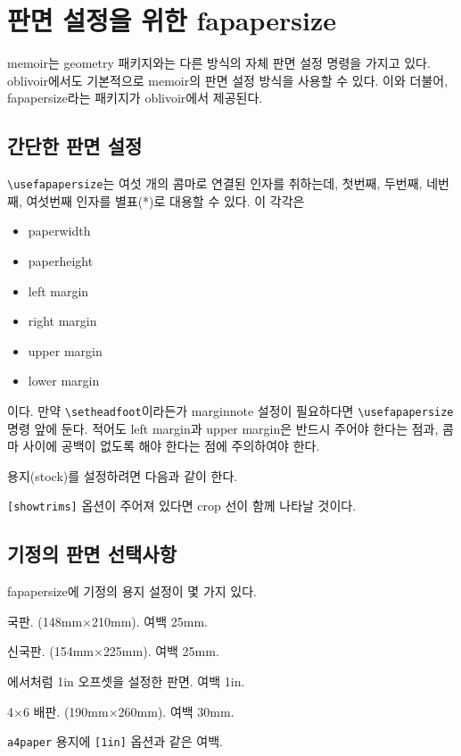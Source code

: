 \documentclass[
	12pt,
	a4paper,
	kosection,
	footnote,
	microtype,
	figtabcapt,
]{oblivoir}
\def\cs#1{\texttt{\textbackslash #1}}
\begin{document}
\clearpage

\section{판면 설정을 위한 fapapersize}

memoir는 geometry 패키지와는 다른 방식의 자체 판면 설정 명령을 가지고 있다.
oblivoir에서도 기본적으로 memoir의 판면 설정 방식을 사용할 수 있다.
이와 더불어, \textsf{fapapersize}라는 패키지가
oblivoir에서 제공된다.

\subsection{간단한 판면 설정}

\begin{boxedverbatim}
\usepackage{fapapersize}
\usefapapersize{*,*,1in,*,1in,*}
\end{boxedverbatim}

\cs{usefapapersize}는 여섯 개의 콤마로 연결된 인자를 취하는데, 첫번째, 두번째, 네번째, 여섯번째 인자를 별표(*)로 대용할 수 있다. 이 각각은 
\begin{itemize}\tightlist
\item paperwidth
\item paperheight
\item left margin
\item right margin
\item upper margin
\item lower margin
\end{itemize}
이다. 만약 \cs{setheadfoot}이라든가 marginnote 설정이 필요하다면 \cs{usefapapersize} 명령 앞에 둔다.
적어도 left margin과 upper margin은 반드시 주어야 한다는 점과, 콤마 사이에 공백이 없도록 해야 한다는 점에 주의하여야 한다.

용지(stock)를 설정하려면 다음과 같이 한다.
\begin{boxedverbatim}
\usepackage[stock]{fapapersize}
\usefastocksize{210mm,297mm}
\usefapapersize{190mm,260mm,1in,*,1in,*}
\end{boxedverbatim}
\texttt{[showtrims]} 옵션이 주어져 있다면 crop 선이 함께 나타날 것이다.

\subsection{기정의 판면 선택사항}

\textsf{fapapersize}에 기정의 용지 설정이 몇 가지 있다.
\begin{description} \tightlist
\item [mum] 국판. (148mm$\times$210mm). 여백 25mm.
\item [newmum] 신국판. (154mm$\times$225mm). 여백 25mm.
\item [1in] 에서처럼 1in 오프셋을 설정한 판면. 여백 1in.
\item [dbl4x6] 4$\times$6 배판. (190mm$\times$260mm). 여백 30mm.
\item [a4] \texttt{a4paper} 용지에 \texttt{[1in]} 옵션과 같은 여백.
\end{description}
\end{document}
